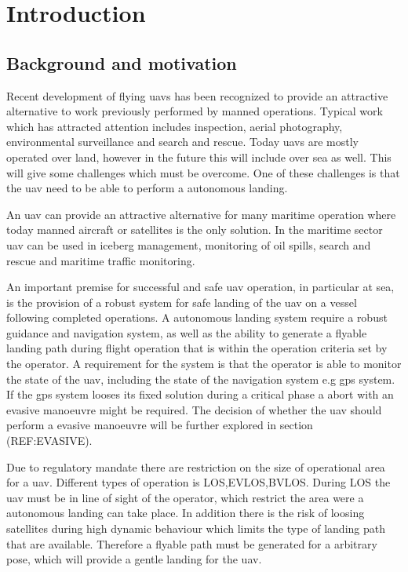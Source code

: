 
\chapter{Introduction}

\section{Background and motivation}
Recent development of flying \glspl{uav} has been recognized to provide an attractive alternative to work previously performed by manned operations. Typical work which has attracted attention includes inspection, aerial photography, environmental surveillance and search and rescue. Today \glspl{uav} are mostly operated over land, however in the future this will include over sea as well. This will give some challenges which must be overcome. One of these challenges is that the \gls{uav} need to be able to perform a autonomous landing.

An \gls{uav} can provide an attractive alternative for many maritime operation where today manned aircraft or satellites is the only solution. In the maritime sector \gls{uav} can be used in iceberg management, monitoring of oil spills, search and rescue and maritime traffic monitoring.

An important premise for successful and safe \gls{uav} operation, in particular at sea, is the provision of a robust system for safe landing of the \gls{uav} on a vessel following completed operations. A autonomous landing system require a robust guidance and navigation system, as well as the ability to generate a flyable landing path during flight operation that is within the operation criteria set by the operator. A requirement for the system is that the operator is able to monitor the state of the uav, including the state of the navigation system e.g gps system. If the gps system looses its fixed solution during a critical phase a abort with an evasive manoeuvre might be required. The decision of whether the uav should perform a evasive manoeuvre will be further explored in section (REF:EVASIVE).

Due to regulatory mandate there are restriction on the size of operational area for a uav. Different types of operation is LOS,EVLOS,BVLOS. During LOS the uav must be in line of sight of the operator, which restrict the area were a autonomous landing can take place. In addition there is the risk of loosing satellites during high dynamic behaviour which limits the type of landing path that are available. Therefore a flyable path must be generated for a arbitrary pose, which will provide a gentle landing for the uav. 


